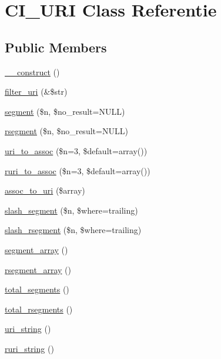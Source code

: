 \hypertarget{class_c_i___u_r_i}{}\section{C\+I\+\_\+\+U\+RI Class Referentie}
\label{class_c_i___u_r_i}
\subsection*{Public Members}
\begin{DoxyCompactItemize}
\item 
\mbox{\hyperlink{class_c_i___u_r_i_a095c5d389db211932136b53f25f39685}{\+\_\+\+\_\+construct}} ()
\item 
\mbox{\hyperlink{class_c_i___u_r_i_a0449aea4e186717ecbf1eacfc59fc5b6}{filter\+\_\+uri}} (\&\$str)
\item 
\mbox{\hyperlink{class_c_i___u_r_i_aeea297fbd38079886a2de35d633c1ed5}{segment}} (\$n, \$no\+\_\+result=N\+U\+LL)
\item 
\mbox{\hyperlink{class_c_i___u_r_i_a0fbd875ee8f8965b0b495b1dce0080fb}{rsegment}} (\$n, \$no\+\_\+result=N\+U\+LL)
\item 
\mbox{\hyperlink{class_c_i___u_r_i_a67cca74de71898ee88c167a265cff140}{uri\+\_\+to\+\_\+assoc}} (\$n=3, \$default=array())
\item 
\mbox{\hyperlink{class_c_i___u_r_i_a3f375a2026349f1fce7915966eba6d5b}{ruri\+\_\+to\+\_\+assoc}} (\$n=3, \$default=array())
\item 
\mbox{\hyperlink{class_c_i___u_r_i_a5c17149885c92fef1ed7f191f14a3f4d}{assoc\+\_\+to\+\_\+uri}} (\$array)
\item 
\mbox{\hyperlink{class_c_i___u_r_i_ac0b17861bb5ec6faf59d1157b9b60131}{slash\+\_\+segment}} (\$n, \$where=\textquotesingle{}trailing\textquotesingle{})
\item 
\mbox{\hyperlink{class_c_i___u_r_i_abeb00696116ba389fe26f3e49fd69ed5}{slash\+\_\+rsegment}} (\$n, \$where=\textquotesingle{}trailing\textquotesingle{})
\item 
\mbox{\hyperlink{class_c_i___u_r_i_ac0db37475b7a41e156f2e9375a2b7cc6}{segment\+\_\+array}} ()
\item 
\mbox{\hyperlink{class_c_i___u_r_i_aaac2da0a6641a4a874a178442eb99624}{rsegment\+\_\+array}} ()
\item 
\mbox{\hyperlink{class_c_i___u_r_i_a5805c40e1c916e7b00b49f131765ac1c}{total\+\_\+segments}} ()
\item 
\mbox{\hyperlink{class_c_i___u_r_i_aead39329dc096b94eef0955fdcdd635f}{total\+\_\+rsegments}} ()
\item 
\mbox{\hyperlink{class_c_i___u_r_i_ac7a3f945c14cc37f89b6d9d1c7a037a4}{uri\+\_\+string}} ()
\item 
\mbox{\hyperlink{class_c_i___u_r_i_a53a97a8b68f500980b84e3b060400221}{ruri\+\_\+string}} ()
\end{DoxyCompactItemize}
